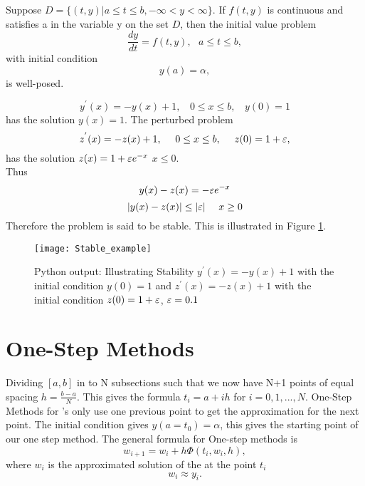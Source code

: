 \begin{theorem}
Suppose $D= \{(t,y) | a\leq t \leq b, -\infty <y < \infty \}$.
If $f(t,y)$ is continuous and satisfies a  in the variable y on
the set $D$, then the initial value problem 
\[\frac{dy}{dt}=f(t,y), \ \ \  a\leq t \leq b,\]
with initial condition
\[y(a) = \alpha, \]
is well-posed.
\end{theorem}
\begin{example}
\[y^{'}(x)=-y(x)+1, \ \ \ \ 0\leq x \leq b, \ \ \ \ y(0)=1 \]
has the solution $y(x)=1$. The perturbed problem
\[z^{'}(x)=-z(x)+1, \ \ \ \ 0\leq x \leq b, \ \ \ \ z(0)=1+\va, \]
has the solution $z(x)=1+\varepsilon e^{-x}$ $x \leq 0$.\\
Thus 
\[y(x)-z(x)=-\varepsilon e^{-x} \]
\[|y(x)-z(x)|\leq |\varepsilon| \ \ \ \ x \geq 0 \]
Therefore the problem is said to be stable. This is illustrated in Figure \ref{Stable ODE}. 
\begin{figure}[H]
\centering
\texttt{[image: Stable\_example]}
\caption{Python output: Illustrating Stability $y^{'}(x)=-y(x)+1$ with the initial condition $y(0)=1$ and $z^{'}(x)=-z(x)+1$ with the initial condition $z(0)=1+\varepsilon$, $\varepsilon=0.1$}
\label{Stable ODE}
\end{figure}

\end{example}

\section{One-Step Methods}
Dividing $[a,b]$ in to N subsections
such that we now have N+1 points of equal spacing $h=\frac{b-a}{N}$. This gives
the formula $t_i=a+ih$ for $i=0,1,...,N$.  
One-Step Methods for 's only use one previous point to get
the approximation for the next point.  The initial condition gives $y(a=t_0)=\alpha$, this gives the starting point of our one step method.  The general formula
for One-step methods is 
\[ w_{i+1}=w_i+h\Phi(t_i,w_i,h), \] 
where $w_i$ is the approximated solution of the  at the point $t_i$
\[w_i\approx y_i.\]


